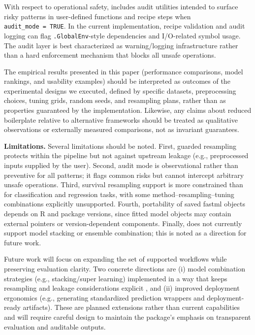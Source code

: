 With respect to operational safety,  includes audit utilities intended to surface risky patterns in user-defined functions and recipe steps when \texttt{audit\_mode\ =\ TRUE}. In the current implementation, recipe validation and audit logging can flag \texttt{.GlobalEnv}-style dependencies and I/O-related symbol usage. The audit layer is best characterized as warning/logging infrastructure rather than a hard enforcement mechanism that blocks all unsafe operations.

The empirical results presented in this paper (performance comparisons, model rankings, and usability examples) should be interpreted as outcomes of the experimental designs we executed, defined by specific datasets, preprocessing choices, tuning grids, random seeds, and resampling plans, rather than as properties guaranteed by the implementation. Likewise, any claims about reduced boilerplate relative to alternative frameworks should be treated as qualitative observations or externally measured comparisons, not as invariant guarantees.

\textbf{Limitations.}
Several limitations should be noted. First, guarded resampling protects within the pipeline but not against upstream leakage (e.g., preprocessed inputs supplied by the user). Second, audit mode is observational rather than preventive for all patterns; it flags common risks but cannot intercept arbitrary unsafe operations. Third, survival resampling support is more constrained than for classification and regression tasks, with some method--resampling--tuning combinations explicitly unsupported. Fourth, portability of saved fastml objects depends on R and package versions, since fitted model objects may contain external pointers or version-dependent components. Finally,  does not currently support model stacking or ensemble combination; this is noted as a direction for future work.

Future work will focus on expanding the set of supported workflows while preserving evaluation clarity. Two concrete directions are (i) model combination strategies (e.g., stacking/super learning) implemented in a way that keeps resampling and leakage considerations explicit \citep{vanDerLaan:2007aa}, and (ii) improved deployment ergonomics (e.g., generating standardized prediction wrappers and deployment-ready artifacts). These are planned extensions rather than current capabilities and will require careful design to maintain the package's emphasis on transparent evaluation and auditable outputs.

